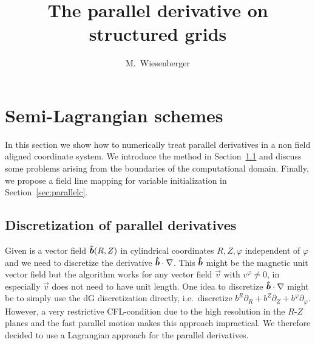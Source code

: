 






\title{The parallel derivative on structured grids}
\author{M.~Wiesenberger}
 
\maketitle
\section{Semi-Lagrangian schemes} \label{sec:parallel}
In this section we show how to numerically treat parallel derivatives in a non field
aligned coordinate system.
We introduce the method in Section~\ref{sec:parallela} %
and discuss some problems arising from the boundaries of the computational domain.
Finally, we propose a field line mapping for variable initialization in Section~\ref{sec:parallelc}.

\subsection{Discretization of parallel derivatives} \label{sec:parallela}
Given is a vector field $\bm{\hat{b}}(R,Z)$ in cylindrical coordinates $R,Z,\varphi$ independent of $\varphi$ and we need to 
discretize the derivative $\bm{\hat{b}} \cdot\nabla$. 
This $\bm{\hat{b}}$ might be the magnetic unit vector field but the algorithm works 
for any vector field $\vec v$ with $v^\varphi\neq 0$, in especially $\vec v$ does not need
to have unit length.
One idea to discretize $\bm{\hat{b}}\cdot\nabla$ might be to simply use 
the dG discretization directly, i.e.~discretize $b^R\partial_R+b^Z\partial_Z+b^\varphi\partial_\varphi$.
However, a very restrictive CFL-condition due to the high resolution
in the $R$-$Z$ planes and the fast parallel motion makes 
this approach impractical. We therefore decided to use a 
Lagrangian approach for the parallel derivatives.


